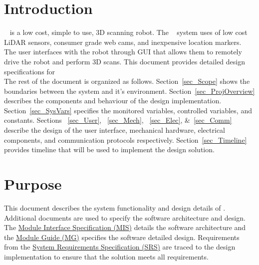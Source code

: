 \documentclass[12pt, titlepage]{article}
\begin{document}
\newpage

\tableofcontents

\newpage

\listoftables

\listoffigures

\newpage


\section{Introduction}


\progname~ is a low cost, simple to use, 3D scanning robot. The \progname~ system uses of low cost LiDAR sensors, consumer grade web cams, and inexpensive location markers. The user interfaces with the robot through GUI that allows them to remotely drive the robot and perform 3D scans. This document provides detailed design specifications for ~\progname\\

The rest of the document is organized as follows. Section~\ref{sec_Scope} shows the boundaries between the system and it's environment. Section~\ref{sec_ProjOverview} describes the components and behaviour of the design implementation. Section~\ref{sec_SysVars} specifies the monitored variables, controlled variables, and constants. Sections ~\ref{sec_User}, ~\ref{sec_Mech}, ~\ref{sec_Elec}, \&~\ref{sec_Comm} describe the design of the user interface, mechanical hardware,  electrical components, and communication protocols respectively. Section~\ref{sec_Timeline} provides timeline that will be used to implement the design solution.
\section{Purpose}
\label{sec_Purpose}


This document describes the system functionality and design details of \progname. Additional documents are used to specify the software architecture and design. The \href{https://github.com/mac-casellaj/LiDart/blob/main/docs/Design/SoftDetailedDes/MIS.pdf}{Module Interface Specification (MIS)} \cite{MIS} details the software architecture and the \href{https://github.com/mac-casellaj/LiDart/blob/main/docs/Design/SoftArchitecture/MG.pdf}{Module Guide (MG)} \cite{MG} specifies the software detailed design. Requirements from the \href{https://github.com/mac-casellaj/LiDart/blob/main/docs/SRS/SRS.pdf}{System Requirements Specification (SRS)} \cite{SRS} are traced to the design implementation to ensure that the solution meets all requirements. 
\end{document}
